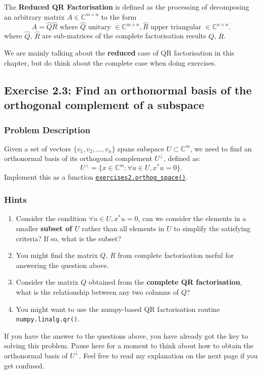 \begin{definition}
  The \textbf{Reduced QR Factorisation} is defined as the processing of decomposing an arbitrary matrix $A \in \mathbb{C}^{m \times  n}$ to the form
  \[
    A = \hat{Q}\hat{R} \text{ where } \hat{Q} \text{ unitary } \in \mathbb{C}^{m \times n}, \hat{R}  \text{ upper triangular } \in \mathbb{C}^{n \times n}
  .\]
  where \(\hat{Q}\), \(\hat{R}\) are sub-matrices of the  complete factorisation results \(Q\), \(R\).
\end{definition}
We are mainly talking about the \textbf{reduced} case of QR factorisation in this chapter, but do think about the complete case when doing exercises.

\subsection*{Exercise 2.3: Find an orthonormal basis of the orthogonal complement of a subspace}
\subsubsection*{Problem Description}%
\label{ssub:problem_description}

Given a set of vectors $ \{v_1, v_2, \ldots, v_n\}$ spans subspace $U \subset \mathbb{C}^{m}$, we need to find an orthonormal basis of its orthogonal complement $U^{\bot}$, defined as:
\[
U^{\bot} = \{x \in \mathbb{C}^{m}: \forall u \in U, x^{*}u = 0\} 
.\] 
Implement this as a function \href{https://comp-lin-alg.github.io/cla_utils.html#cla_utils.exercises2.orthog_space}{\texttt{exercises2.orthog\_space()}}. \medskip

\subsubsection*{Hints}
\begin{enumerate}
  \item Consider the condition \(\forall u \in U, x^{*}u = 0\), can we consider the elements in a smaller \textbf{subset of \(U\)} rather than all elements in \(U\) to simplify the satisfying criteria? If so, what is the subset?
  \item You might find the matrix \(Q\), \(R\) from complete factorisation useful for answering the question above.    
  \item Consider the matrix \(Q\) obtained from the \textbf{complete QR factorisation}, what is the relationship between any two columns of \(Q\)?  
  \item You might want to use the numpy-based QR factorisation routine \texttt{numpy.linalg.qr()}.
\end{enumerate}
If you have the answer to the questions above, you have already got the key to solving this problem. Pause here for a moment to think about how to obtain the orthonormal basis of \(U^{\bot}\). Feel free to read my explanation on the next page if you get confused. \medskip

